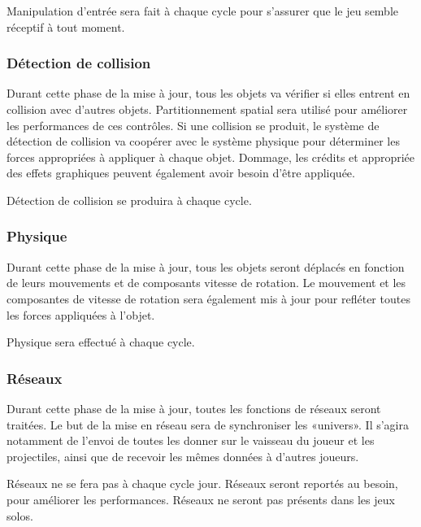 Manipulation d'entrée sera fait à chaque cycle  pour s'assurer que le jeu semble réceptif à tout moment.


\subsubsection{Détection de collision} %
\label{ssub:détection_de_collision}

Durant cette phase de la mise à jour, tous les objets va vérifier si elles entrent en collision avec d'autres objets. Partitionnement spatial sera utilisé pour améliorer les performances de ces contrôles. Si une collision se produit, le système de détection de collision va coopérer avec le système physique pour déterminer les forces appropriées à appliquer à chaque objet. Dommage, les crédits et appropriée des effets graphiques peuvent également avoir besoin d'être appliquée. 

Détection de collision se produira à chaque cycle.


\subsubsection{Physique} %
\label{ssub:physique}

Durant cette phase de la mise à jour, tous les objets seront déplacés en fonction de leurs mouvements et de composants vitesse de rotation. Le mouvement et les composantes de vitesse de rotation sera également mis à jour pour refléter toutes les forces appliquées à l'objet. 

Physique sera effectué à chaque cycle.


\subsubsection{Réseaux} %
\label{ssub:réseau}

Durant cette phase de la mise à jour, toutes les fonctions de réseaux seront traitées. Le but de la mise en réseau sera de synchroniser les «univers». Il s'agira notamment de l'envoi de toutes les donner sur le vaisseau du joueur et les projectiles, ainsi que de recevoir les mêmes données à d'autres joueurs. 

Réseaux ne se fera pas à chaque cycle jour. Réseaux seront reportés au besoin, pour améliorer les performances. Réseaux ne seront pas présents dans les jeux solos.

